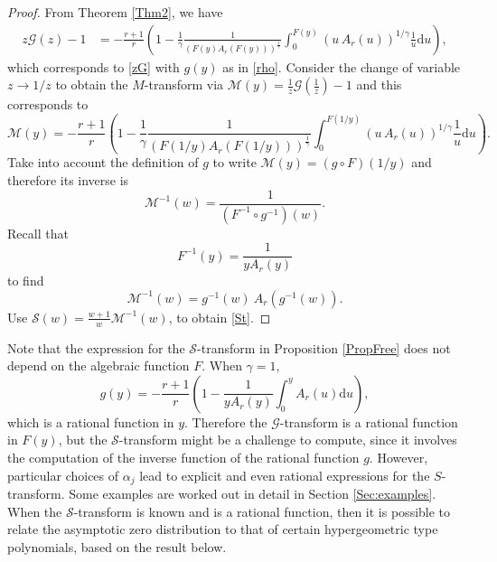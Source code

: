 \documentclass[12pt]{article}
\newcommand{\St}{\mathcal{S}} %
\newcommand{\Gt}{\mathcal{G}} %
\newcommand{\Mt}{\mathcal{M}} %
\numberwithin{equation}{section}
\begin{document}
\begin{proof} From Theorem \ref{Thm2}, we have 
\begin{align*}
	z\Gt (z)-1
	&=  - \frac{r+1}{r}
	\left( 1- \frac{1}{\gamma } \frac{1}{\left(F(y) A_r(F(y))\right)^{\frac{1}{\gamma}}} \int_0^{F(y)}  \left(u \, A_r(u)\right) ^{1/\gamma}	\frac{1}{u}\mathrm{d}u  \right) , 
\end{align*}
which corresponds to \eqref{zG} with $g(y)$ as in \eqref{rho}. 
Consider the change of variable \(z\to 1/z\) to obtain the \(M\)-transform via 
\(\Mt  (y) = \frac{1}{z}\Gt \left(\frac{1}{z}\right) -1\) and this corresponds to
\begin{equation*}
\Mt (y)=  
	 - \frac{r+1}{r}
	\left( 1- \frac{1}{\gamma } \frac{1}{\left(F(1/y) A_r(F(1/y))\right)^{\frac{1}{\gamma}}} \int_0^{F(1/y)}  \left(u \, A_r(u)\right) ^{1/\gamma}	\frac{1}{u}\mathrm{d}u  \right) .
\end{equation*}
Take into account the definition of \(g\) to write 
\(
	\Mt (y) = (g\circ F)(1/y)
\) and therefore its inverse is 
\[
	\Mt ^{-1} (w)= \frac{1}{\left(F^{-1} \circ g^{-1} \right) (w)}. 
\]
Recall that 
\[
	F^{-1} (y) = \frac{1}{yA_r(y)}
\]
to find 
\[
	\Mt ^{-1} (w)=   g^{-1} (w) \ A_r(g^{-1} (w)). 
\]
Use \(\St (w) =  \frac{w+1}{w} \Mt ^{-1}(w) \), to obtain \eqref{St}. 
%
\end{proof}

Note that the expression for the \(\St\)-transform in Proposition \ref{PropFree} does not depend on the algebraic function \(F\). 
When \(\gamma=1\),  
\[
	g(y)= -\frac{r+1}{r}\left( 1- \frac{1}{yA_r(y)}\int_0^{y}  	A_r(u)	\mathrm{d}u  \right), 
\] 
which is a rational function in \(y\). Therefore the \(\Gt\)-transform is a rational function in \(F(y)\), but the \(\St\)-transform might be a challenge to compute, since it involves the computation of the inverse function of the rational function \(g\). 
However, particular choices of \(\alpha_j\) lead to explicit and even rational expressions for the \(S\)-transform. Some examples are worked out in detail in Section \ref{Sec:examples}. When the $\St$-transform is known and is a rational function, then it is possible to relate the asymptotic zero distribution to that of certain  hypergeometric type polynomials, based on the result below. 
\end{document}

